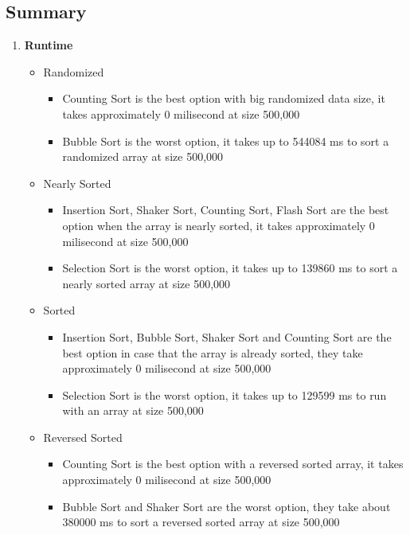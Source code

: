 \documentclass[11pt,a4paper]{article}
\begin{document}
{{	\subsection{Summary}
	    \begin{enumerate}
	        \item \textbf{Runtime}
	            \begin{itemize}
	                \item Randomized 
	                \begin{itemize}
	                    \item Counting Sort is the best option with big randomized data size, it takes approximately 0 milisecond at size 500,000
	                    \item Bubble Sort is the worst option, it takes up to 544084 ms to sort a randomized array at size 500,000
	                \end{itemize}
	                \item Nearly Sorted
	                \begin{itemize}
	                    \item Insertion Sort, Shaker Sort, Counting Sort, Flash Sort are the best option when the array is nearly sorted, it takes approximately 0 milisecond at size 500,000
	                    \item Selection Sort is the worst option, it takes up to 139860 ms to sort a nearly sorted array at size 500,000
	                \end{itemize}
	                \item Sorted
	                \begin{itemize}
	                    \item Insertion Sort, Bubble Sort, Shaker Sort and Counting Sort are the best option in case that the array is already sorted, they take approximately 0 milisecond at size 500,000
	                    \item Selection Sort is the worst option, it takes up to 129599 ms to run with an array at size 500,000
	                \end{itemize}
	                \item Reversed Sorted
	                \begin{itemize}
	                    \item Counting Sort is the best option with a reversed sorted array, it takes approximately 0 milisecond at size 500,000
	                    \item Bubble Sort and Shaker Sort are the worst option, they take about 380000 ms to sort a reversed sorted array at size 500,000

\end{itemize}
\end{itemize}
\end{enumerate}}}
\end{document}
